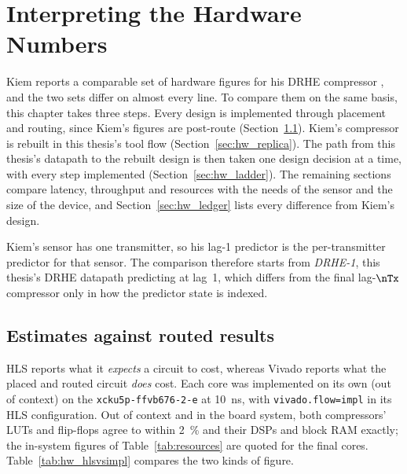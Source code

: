 \chapter{Interpreting the Hardware Numbers}
\label{ch:hwinterpret}

Kiem reports a comparable set of hardware figures for his DRHE compressor
\cite{kiem2025}, and the two sets differ on almost every line. To compare them
on the same basis, this chapter takes three steps. Every design is implemented
through placement and routing, since Kiem's figures are post-route
(Section~\ref{sec:hw_counting}). Kiem's compressor is rebuilt in this thesis's
tool flow (Section~\ref{sec:hw_replica}). The path from this thesis's datapath
to the rebuilt design is then taken one design decision at a time, with every
step implemented (Section~\ref{sec:hw_ladder}). The remaining sections compare
latency, throughput and resources with the needs of the sensor and the size of
the device, and Section~\ref{sec:hw_ledger} lists every difference from Kiem's
design.

Kiem's sensor has one transmitter, so his lag-1 predictor is the
per-transmitter predictor for that sensor. The comparison therefore starts
from \emph{DRHE-1}, this thesis's DRHE datapath predicting at lag~1, which
differs from the final lag-$\nTx$ compressor only in how the predictor state is
indexed.

\section{Estimates against routed results}
\label{sec:hw_counting}

HLS reports what it \emph{expects} a circuit to cost, whereas Vivado reports
what the placed and routed circuit \emph{does} cost. Each core was implemented
on its own (out of context) on the \texttt{xcku5p-ffvb676-2-e} at
\SI{10}{\nano\second}, with \texttt{vivado.flow=impl} in its HLS configuration.
Out of context and in the board system, both compressors' LUTs and flip-flops
agree to within \SI{2}{\percent} and their DSPs and block RAM exactly; the
in-system figures of Table~\ref{tab:resources} are quoted for the final cores.
Table~\ref{tab:hw_hlsvsimpl} compares the two kinds of figure.

